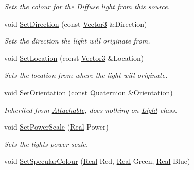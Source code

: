 \begin{DoxyCompactItemize}
\begin{DoxyCompactList}\small\item\em Sets the colour for the Diffuse light from this source. \item\end{DoxyCompactList}\item 
void \hyperlink{classMezzanine_1_1Light_a22cbfb15ef1c7caf1011574f568d19de}{SetDirection} (const \hyperlink{classMezzanine_1_1Vector3}{Vector3} \&Direction)
\begin{DoxyCompactList}\small\item\em Sets the direction the light will originate from. \item\end{DoxyCompactList}\item 
void \hyperlink{classMezzanine_1_1Light_ac06da317651df700c2969cc81c3f8d3d}{SetLocation} (const \hyperlink{classMezzanine_1_1Vector3}{Vector3} \&Location)
\begin{DoxyCompactList}\small\item\em Sets the location from where the light will originate. \item\end{DoxyCompactList}\item 
void \hyperlink{classMezzanine_1_1Light_aa2f3fe2b7cb7bf459f2526d2e5c234ed}{SetOrientation} (const \hyperlink{classMezzanine_1_1Quaternion}{Quaternion} \&Orientation)
\begin{DoxyCompactList}\small\item\em Inherited from \hyperlink{classMezzanine_1_1Attachable}{Attachable}, does nothing on \hyperlink{classMezzanine_1_1Light}{Light} class. \item\end{DoxyCompactList}\item 
void \hyperlink{classMezzanine_1_1Light_ad1a8c423c21f192429c01313905fd69a}{SetPowerScale} (\hyperlink{namespaceMezzanine_a726731b1a7df72bf3583e4a97282c6f6}{Real} Power)
\begin{DoxyCompactList}\small\item\em Sets the lights power scale. \item\end{DoxyCompactList}\item 
void \hyperlink{classMezzanine_1_1Light_a1594396da60d45ba12b04f7d8a4ba90e}{SetSpecularColour} (\hyperlink{namespaceMezzanine_a726731b1a7df72bf3583e4a97282c6f6}{Real} Red, \hyperlink{namespaceMezzanine_a726731b1a7df72bf3583e4a97282c6f6}{Real} Green, \hyperlink{namespaceMezzanine_a726731b1a7df72bf3583e4a97282c6f6}{Real} Blue)

\end{DoxyCompactItemize}
